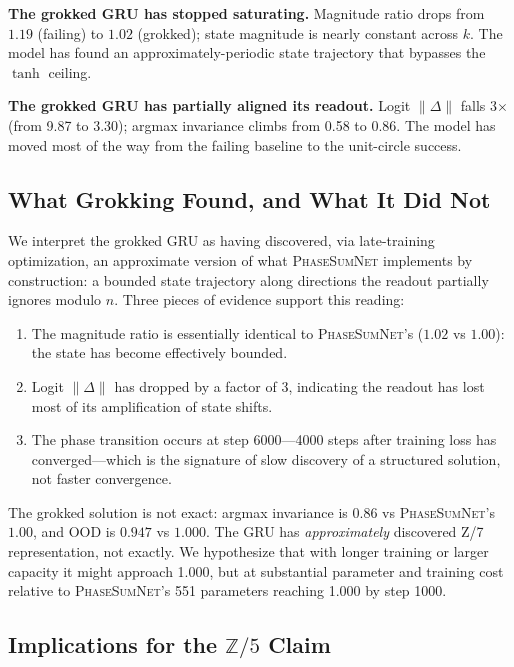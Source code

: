 \documentclass[11pt]{article}
\theoremstyle{definition}
\newcommand{\Z}{\mathbb{Z}}
\begin{document}
\textbf{The grokked GRU has stopped saturating.} Magnitude ratio
drops from $1.19$ (failing) to $1.02$ (grokked); state magnitude is
nearly constant across $k$. The model has found an
approximately-periodic state trajectory that bypasses the $\tanh$
ceiling.

\textbf{The grokked GRU has partially aligned its readout.} Logit
$\|\Delta\|$ falls 3$\times$ (from 9.87 to 3.30); argmax invariance
climbs from 0.58 to 0.86. The model has moved most of the way from
the failing baseline to the unit-circle success.

\subsection{What Grokking Found, and What It Did Not}

We interpret the grokked GRU as having discovered, via late-training
optimization, an approximate version of what \textsc{PhaseSumNet}
implements by construction: a bounded state trajectory along
directions the readout partially ignores modulo $n$. Three pieces
of evidence support this reading:

\begin{enumerate}[itemsep=2pt]
\item The magnitude ratio is essentially identical to
\textsc{PhaseSumNet}'s ($1.02$ vs $1.00$): the state has become
effectively bounded.
\item Logit $\|\Delta\|$ has dropped by a factor of 3, indicating
the readout has lost most of its amplification of state shifts.
\item The phase transition occurs at step 6000---4000 steps after
training loss has converged---which is the signature of slow
discovery of a structured solution, not faster convergence.
\end{enumerate}

The grokked solution is not exact: argmax invariance is $0.86$ vs
\textsc{PhaseSumNet}'s $1.00$, and OOD is $0.947$ vs $1.000$. The
GRU has \emph{approximately} discovered Z/7 representation, not
exactly. We hypothesize that with longer training or larger
capacity it might approach 1.000, but at substantial parameter and
training cost relative to \textsc{PhaseSumNet}'s 551 parameters
reaching 1.000 by step 1000.

\subsection{Implications for the $\Z/5$ Claim}
\end{document}
